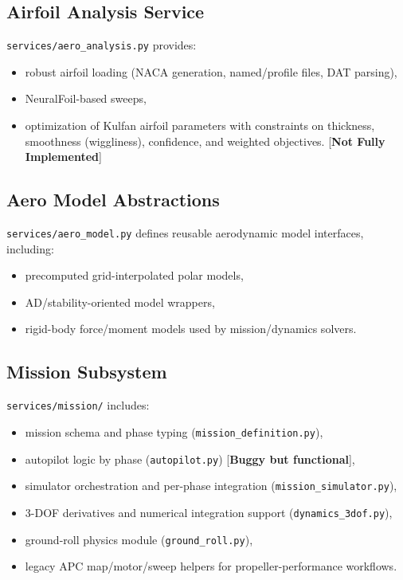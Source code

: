 ﻿\documentclass[11pt]{article}
\begin{document}
\subsection{Airfoil Analysis Service}
\texttt{services/aero\_analysis.py} provides:
\begin{itemize}
\item robust airfoil loading (NACA generation, named/profile files, DAT parsing),
\item NeuralFoil-based sweeps,
\item optimization of Kulfan airfoil parameters with constraints on thickness, smoothness (wiggliness), confidence, and weighted objectives. [{\textbf{Not Fully Implemented}}]
\end{itemize}

\subsection{Aero Model Abstractions}
\texttt{services/aero\_model.py} defines reusable aerodynamic model interfaces, including:
\begin{itemize}
\item precomputed grid-interpolated polar models,
\item AD/stability-oriented model wrappers,
\item rigid-body force/moment models used by mission/dynamics solvers.
\end{itemize}

\subsection{Mission Subsystem}
\texttt{services/mission/} includes:
\begin{itemize}
\item mission schema and phase typing (\texttt{mission\_definition.py}),
\item autopilot logic by phase (\texttt{autopilot.py}) [\textbf{Buggy but functional}],
\item simulator orchestration and per-phase integration (\texttt{mission\_simulator.py}),
\item 3-DOF derivatives and numerical integration support (\texttt{dynamics\_3dof.py}),
\item ground-roll physics module (\texttt{ground\_roll.py}),
\item legacy APC map/motor/sweep helpers for propeller-performance workflows.
\end{itemize}
\end{document}
